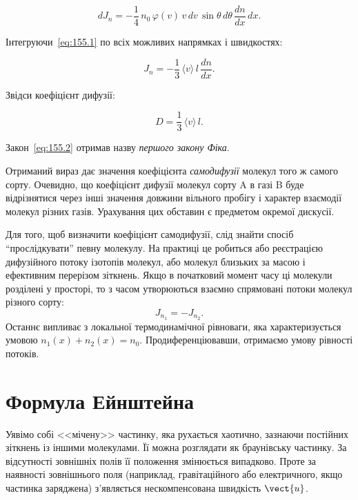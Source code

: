 \begin{equation}
	dJ_n = -\frac{1}{4}\, n_0\, \varphi(v)\, v\, dv\, \sin\theta\, d\theta\,
	\frac{dn}{dx}\, dx.
	\label{eq:155.1}
\end{equation}

Інтегруючи~\eqref{eq:155.1} по всіх можливих напрямках і швидкостях:

\begin{equation}
	J_n = -\frac{1}{3}\, \langle v \rangle\, l\, \frac{dn}{dx}.
	\label{eq:155.2}
\end{equation}

Звідси коефіцієнт дифузії:

\begin{equation}
	D = \frac{1}{3}\, \langle v \rangle\, l.
	\label{eq:155.3}
\end{equation}

Закон~\eqref{eq:155.2} отримав назву \emph{першого закону Фіка}.

Отриманий вираз дає значення коефіцієнта \emph{самодифузії} молекул того ж самого
сорту. Очевидно, що коефіцієнт дифузії молекул сорту A в газі B буде відрізнятися
через інші значення довжини вільного пробігу і характер взаємодії молекул різних
газів. Урахування цих обставин є предметом окремої дискусії.

Для того, щоб визначити коефіцієнт самодифузії, слід знайти спосіб “прослідкувати”
певну молекулу. На практиці це робиться або реєстрацією дифузійного потоку
ізотопів молекул, або молекул близьких за масою і ефективним перерізом зіткнень.
Якщо в початковий момент часу ці молекули розділені у просторі, то з часом
утворюються взаємно спрямовані потоки молекул різного сорту:
\[
	J_{n_1} = - J_{n_2}.
\]
Останнє випливає з локальної термодинамічної рівноваги, яка характеризується
умовою $n_1(x)+n_2(x)=n_0$. Продиференціювавши, отримаємо умову рівності потоків.

\section{Формула Ейнштейна}

Уявімо собі <<мічену>> частинку, яка рухається хаотично, зазнаючи постійних
зіткнень із іншими молекулами. Її можна розглядати як браунівську частинку.
За відсутності зовнішніх полів її положення змінюється випадково. Проте за
наявності зовнішнього поля (наприклад, гравітаційного або електричного, якщо
частинка заряджена) з’являється нескомпенсована швидкість $\vect{u}$.

